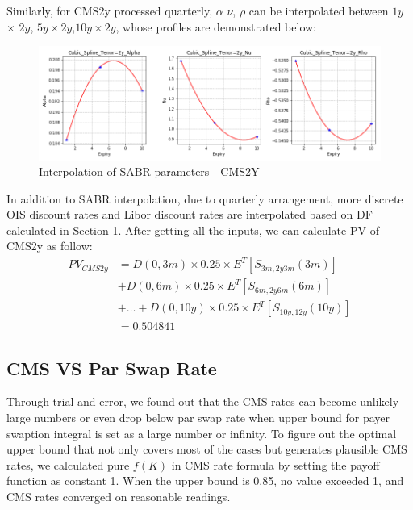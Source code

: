 \documentclass{article}
\begin{document}
	
	
	\noindent Similarly, for CMS2y processed quarterly, $\alpha$ $\nu$, $\rho$ can be interpolated between $1y$ $\times$ $2y$, $5y\times2y$,$10y\times2y$, whose profiles are demonstrated below:\\ 
	
	\begin{figure}[h]
	\centering
	\includegraphics[scale=0.5]{Cubic_2y.png}
	\caption{Interpolation of SABR parameters - CMS2Y}
	\end{figure}	
	
	\noindent In addition to SABR interpolation, due to quarterly arrangement, more discrete OIS discount rates and Libor discount rates are interpolated based on DF calculated in Section 1. After getting all the inputs, we can calculate PV of CMS2y as follow:
	\begin{align*}
	PV_{CMS2y}&=D(0,3m)\times 0.25 \times E^T [S_{3m,2y3m}(3m)] \\&+ D(0,6m) \times 0.25 \times E^T [S_{6m,2y6m}(6m)]\\&+ \dots 
	+D(0,10y) \times 0.25 \times E^T [S_{10y,12y}(10y)]\\&= 0.504841
	\end{align*}

	
	\subsection*{CMS VS Par Swap Rate}
	Through trial and error, we found out that the CMS rates can become unlikely large numbers or even drop below par swap rate when upper bound for payer swaption integral is set as a large number or infinity. To figure out the optimal upper bound that not only covers most of the cases but generates plausible CMS rates, we calculated pure $f(K)$ in CMS rate formula by setting the payoff function as constant 1. When the upper bound is 0.85, no value exceeded 1, and CMS rates converged on reasonable readings.
\end{document}

